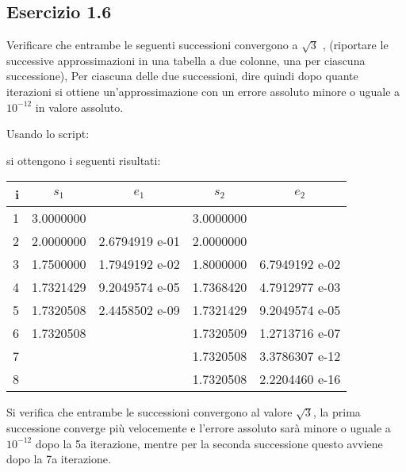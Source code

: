 	\subsection{Esercizio 1.6}
Verificare che entrambe le seguenti successioni convergono a $\sqrt{3}$ , (riportare le successive approssimazioni in una tabella a due colonne, una per ciascuna successione),
Per ciascuna delle due successioni, dire quindi dopo quante iterazioni si ottiene un’approssimazione con un errore assoluto minore o uguale a $10^{-12}$ in valore assoluto.

\par
Usando lo script:

si ottengono i seguenti risultati:

\begin{tabular}{ r | c | c | c | c }
		
  \textbf{i} & \textbf{$s_1$} & \textbf{$e_1$} & \textbf{$s_2$} & \textbf{$e_2$} \\
  \hline	
  	1 & 3.0000000 &                & 3.0000000 &               \\
	2 & 2.0000000 & 2.6794919 e-01 & 2.0000000 &               \\
	3 & 1.7500000 & 1.7949192 e-02 & 1.8000000 & 6.7949192 e-02\\
	4 & 1.7321429 & 9.2049574 e-05 & 1.7368420 & 4.7912977 e-03\\
	5 & 1.7320508 & 2.4458502 e-09 & 1.7321429 & 9.2049574 e-05\\
	6 & 1.7320508 &                & 1.7320509 & 1.2713716 e-07\\
	7 &           &                & 1.7320508 & 3.3786307 e-12\\
	8 &           &                & 1.7320508 & 2.2204460 e-16\\
  \hline  
\end{tabular}

Si verifica che entrambe le successioni convergono al valore $\sqrt{3}$, la prima successione converge più velocemente e l'errore assoluto sarà minore o uguale a $10^{-12}$ dopo la 5a iterazione, mentre per la seconda successione questo avviene dopo la 7a iterazione.